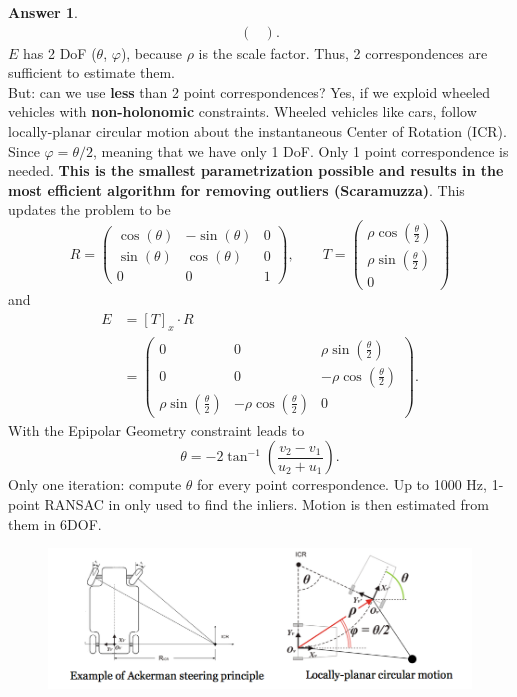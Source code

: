 \documentclass[a4paper,12 pt]{article}
\theoremstyle{definition}
\theoremstyle{remark}
\theoremstyle{definition}
\theoremstyle{definition}
\theoremstyle{definition}
\theoremstyle{definition}
\theoremstyle{remark}
\theoremstyle{remark}
\theoremstyle{definition}
\theoremstyle{definition}
\newtheorem*{answer}{Answer}
\begin{document}
\begin{enumerate}
\begin{answer}
\begin{equation}
\begin{split}
\begin{pmatrix}
\end{pmatrix}.
\end{split}
\end{equation}
$E$ has 2 DoF ($\theta$, $\varphi$), because $\rho$ is the scale factor. Thus, 2 correspondences are sufficient to estimate them.\\
But: can we use \textbf{less} than 2 point correspondences? Yes, if we exploid wheeled vehicles with \textbf{non-holonomic} constraints. Wheeled vehicles like cars, follow locally-planar circular motion about the instantaneous Center of Rotation (ICR). Since $\varphi=\theta/2$, meaning that we have only 1 DoF. Only 1 point correspondence is needed. \textbf{This is the smallest parametrization possible and results in the most efficient algorithm for removing outliers (Scaramuzza)}. This updates the problem to be
\begin{equation}
R=\begin{pmatrix}
\cos(\theta)&-\sin(\theta)&0\\
\sin(\theta)&\cos(\theta)&0\\
0&0&1
\end{pmatrix}, \qquad T=\begin{pmatrix}
\rho \cos(\frac{\theta}{2})\\
\rho \sin(\frac{\theta}{2})\\
0
\end{pmatrix}
\end{equation}
and
\begin{equation}
\begin{split}
E&=[T]_x\cdot R\\
&=\begin{pmatrix}
0&0&\rho \sin(\frac{\theta}{2})\\
0&0&-\rho \cos(\frac{\theta}{2})\\
\rho \sin(\frac{\theta}{2})&-\rho\cos(\frac{\theta}{2})&0
\end{pmatrix}.
\end{split}
\end{equation}
With the Epipolar Geometry constraint leads to
\begin{equation}
\theta = -2 \tan^{-1}\left(\frac{v_2-v_1}{u_2+u_1} \right).
\end{equation}
Only one iteration: compute $\theta$ for every point correspondence.
Up to 1000 Hz, 1-point RANSAC in only used to find the inliers. Motion is then estimated from them in 6DOF.
\begin{figure}[h!]
\begin{center}
\includegraphics[scale=0.4]{pics/holonomic}

\end{center}
\end{figure}
\end{answer}
\end{enumerate}
\end{document}
